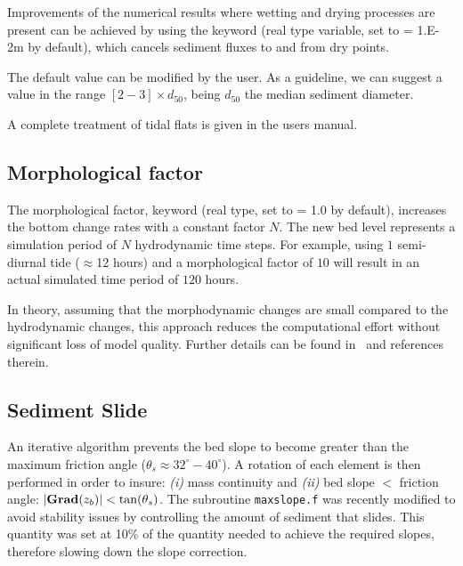 Improvements of the numerical results where wetting and drying processes are present can be achieved by using the keyword  (real type variable, set to {\ttfamily = 1.E-2}m by default), which cancels sediment fluxes to and from dry points.  

The default value can be modified by the user. As a guideline, we can suggest a value in the range $[2-3]\times d_{50}$, being $d_{50}$ the median sediment diameter.

A complete treatment of tidal flats is given in the  users manual.


\subsection{Morphological factor}
The morphological factor, keyword  (real type, set to {\ttfamily = 1.0} by default), increases the bottom change rates with a constant factor $N$. The new bed level represents a simulation period of $N$ hydrodynamic time steps. For example, using $1$ semi-diurnal tide ($\approx$12 hours) and a morphological factor of $10$ will result in an actual simulated time period of $120$ hours.

In theory, assuming that the morphodynamic changes are small compared to the hydrodynamic changes, 
this approach reduces the computational effort without significant loss of model quality. Further details can be found in~\cite{Knaapen12} and references therein.

\subsection{Sediment Slide}
An iterative algorithm prevents the bed slope to become greater than the maximum friction angle ($\theta_s \approx 32^\circ-40^\circ$). A rotation of each element is then performed in order to insure: \textit{(i)} mass continuity and \textit{(ii)} bed slope $<$ friction angle: $|\text{\bfseries{Grad}}(z_b)| < \tan(\theta_s)$. The subroutine \texttt{maxslope.f} was recently modified to avoid stability issues by controlling the amount of sediment that slides. This quantity was set at 10\% of the quantity needed to achieve the required slopes, therefore slowing down the slope correction.\\


